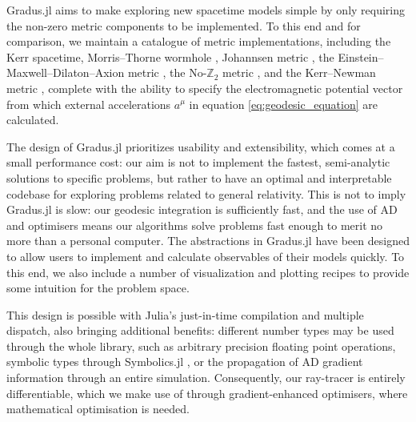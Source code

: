\documentclass[fleqn,usenatbib]{mnras}
\newcommand{\software}[1]{{\sc #1}}
\newcommand{\Gradus}{\software{Gradus.jl}\xspace}
\begin{document}
\Gradus aims to make exploring new spacetime models simple by only requiring the
non-zero metric components to be implemented. To this end and for comparison, we
maintain a catalogue of metric implementations, including the Kerr spacetime,
Morris--Thorne wormhole \citep{morris_wormholes_1988}, Johannsen metric
\cite{johannsen_regular_2013}, the Einstein--Maxwell--Dilaton--Axion metric
\citep{garcia_class_1995}, the No-$\mathbb{Z}_2$ metric
\citep{chen_observational_2024}, and the Kerr--Newman
metric \citep[e.g.][]{hackmann_charged_2013}, complete with the ability to
specify the electromagnetic potential vector from which external accelerations
$a^\mu$ in equation \eqref{eq:geodesic_equation} are calculated.

The design of \Gradus prioritizes usability and extensibility, which comes at a
small performance cost: our aim is not to implement the fastest, semi-analytic
solutions to specific problems, but rather to have an optimal and interpretable
codebase for exploring problems related to general relativity.  This is not to
imply \Gradus is slow: our geodesic integration is sufficiently fast, and the
use of AD and optimisers means our algorithms solve problems fast enough to
merit no more than a personal computer. The abstractions in \Gradus have been
designed to allow users to implement and calculate observables of their models
quickly. To this end, we also include a number of visualization and plotting
recipes to provide some intuition for the problem space.

This design is possible with Julia's just-in-time compilation and multiple
dispatch, also bringing additional benefits: different number types may be used
through the whole library, such as arbitrary precision floating point
operations, symbolic types through Symbolics.jl \citep{symbolics_julia}, or the
propagation of AD gradient information through an entire simulation.
Consequently, our ray-tracer is entirely differentiable, which we make use of
through gradient-enhanced optimisers, where mathematical optimisation is needed.


\end{document}
